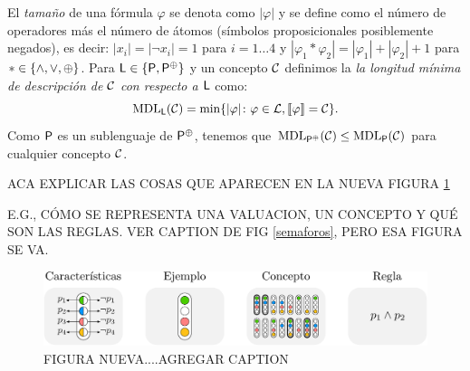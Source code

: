 El {\em tamaño} de una fórmula $\varphi$ se denota como $|\varphi|$ y se define como el número de operadores más el número de átomos (símbolos proposicionales posiblemente negados), es decir: $|x_i|=|\lnot x_i|=1$ para $i=1\dots 4$ y $|\varphi_1*\varphi_2|=|\varphi_1|+|\varphi_2|+1$ para $*\in\{\wedge,\vee,\oplus\}$. Para ${\sf L} \in\{{\sf P},{\sf P}^\oplus\}$ y un concepto $\mathcal{C}$ definimos la {\em la longitud mínima de descripción de $\mathcal{C}$ con respecto a $\mathcal {\sf L}$} como:
$$
{\rm MDL}_{\sf L}(\mathcal{C})=\min\{|\varphi|\colon \varphi\in\mathcal L, \llbracket \varphi\rrbracket=\mathcal{C}\}.
$$
Como ${\sf P}$ es un sublenguaje de ${\sf P}^\oplus$, tenemos que ${\rm MDL}_{{\sf P}^\oplus}(\mathcal{C})\leq{\rm MDL}_{{\sf P}}(\mathcal{C})$ para cualquier concepto $\mathcal{C}$.

   \color{black}


ACA EXPLICAR LAS COSAS QUE APARECEN EN LA NUEVA FIGURA \ref{fig:notacionPRE} 

E.G., CÓMO SE REPRESENTA UNA VALUACION, UN CONCEPTO Y QUÉ SON LAS REGLAS. VER CAPTION DE FIG \ref{semaforos}, PERO ESA FIGURA SE VA.
 

\begin{figure}[t!]
\includegraphics[scale=.6]{../figuras/pre/notacion.pdf}
\caption{FIGURA NUEVA....AGREGAR CAPTION}\label{fig:notacionPRE}
\end{figure}


